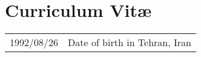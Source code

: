 \chapter*{Curriculum Vit\ae}

\makeatletter
\authors{\@firstname\ {\titleshape\@lastname}}
\makeatother

\noindent
\begin{longtable}{p{} p{}}
    1992/08/26 & Date of birth in Tehran, Iran
\end{longtable}


